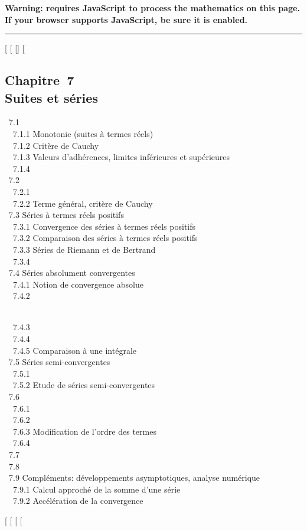 \textbf{Warning: 
requires JavaScript to process the mathematics on this page.\\ If your
browser supports JavaScript, be sure it is enabled.}

\begin{center}\rule{3in}{0.4pt}\end{center}

{[}
{[}
{[}{]}
{[}

\subsection{Chapitre~7\\Suites et séries}

~7.1  \\
~~7.1.1 {Monotonie (suites à
termes réels)} \\ ~~7.1.2 {Critère
de Cauchy} \\ ~~7.1.3 {Valeurs
d'adhérences, limites inférieures et supérieures} \\ ~~7.1.4
 \\ ~7.2
 \\
~~7.2.1  \\
~~7.2.2 {Terme général, critère de
Cauchy} \\ ~7.3 {Séries à termes
réels positifs} \\ ~~7.3.1
{Convergence des séries à termes
réels positifs} \\ ~~7.3.2
{Comparaison des séries à termes
réels positifs} \\ ~~7.3.3 {Séries
de Riemann et de Bertrand} \\ ~~7.3.4
 \\
~7.4 {Séries absolument
convergentes} \\ ~~7.4.1 {Notion
de convergence absolue} \\ ~~7.4.2

\\ ~~7.4.3  \\
~~7.4.4 
\\ ~~7.4.5 {Comparaison à une
intégrale} \\ ~7.5 {Séries
semi-convergentes} \\ ~~7.5.1
 \\ ~~7.5.2
{Etude de séries
semi-convergentes} \\ ~7.6
 \\
~~7.6.1 
\\ ~~7.6.2 
\\ ~~7.6.3 {Modification de
l'ordre des termes} \\ ~~7.6.4
 \\ ~7.7
 \\ ~7.8
 \\ ~7.9
{Compléments: développements
asymptotiques, analyse numérique} \\ ~~7.9.1
{Calcul approché de la somme d'une
série} \\ ~~7.9.2 {Accélération de
la convergence}

{[}
{[}
{[}
{[}
